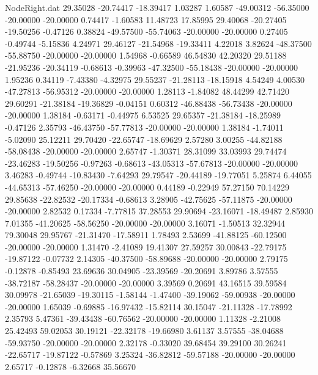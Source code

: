 \begin{filecontents}{NodeRight.dat}
  29.35028  -20.74417  -18.39417     1.03287    1.60587  -49.00312  -56.35000  -20.00000  -20.00000    0.74417   -1.60583   11.48723   17.85995
  29.40068  -20.27405  -19.50256    -0.47126    0.38824  -49.57500  -55.74063  -20.00000  -20.00000    0.27405   -0.49744   -5.15836    4.24971
  29.46127  -21.54968  -19.33411     4.22018    3.82624  -48.37500  -55.88750  -20.00000  -20.00000    1.54968   -0.66589   46.54830   42.20320
  29.51188  -21.95236  -20.34119    -0.68613   -0.39963  -47.32500  -55.18438  -20.00000  -20.00000    1.95236    0.34119   -7.43380   -4.32975
  29.55237  -21.28113  -18.15918     4.54249    4.00530  -47.27813  -56.95312  -20.00000  -20.00000    1.28113   -1.84082   48.44299   42.71420
  29.60291  -21.38184  -19.36829    -0.04151    0.60312  -46.88438  -56.73438  -20.00000  -20.00000    1.38184   -0.63171   -0.44975    6.53525
  29.65357  -21.38184  -18.25989    -0.47126    2.35793  -46.43750  -57.77813  -20.00000  -20.00000    1.38184   -1.74011   -5.02090   25.12211
  29.70420  -22.65747  -18.69629     2.57280    3.00255  -44.82188  -58.08438  -20.00000  -20.00000    2.65747   -1.30371   28.31099   33.03993
  29.74474  -23.46283  -19.50256    -0.97263   -0.68613  -43.05313  -57.67813  -20.00000  -20.00000    3.46283   -0.49744  -10.83430   -7.64293
  29.79547  -20.44189  -19.77051     5.25874    6.44055  -44.65313  -57.46250  -20.00000  -20.00000    0.44189   -0.22949   57.27150   70.14229
  29.85638  -22.82532  -20.17334    -0.68613    3.28905  -42.75625  -57.11875  -20.00000  -20.00000    2.82532    0.17334   -7.77815   37.28553
  29.90694  -23.16071  -18.49487     2.85930    7.01355  -41.20625  -58.56250  -20.00000  -20.00000    3.16071   -1.50513   32.32944   79.30048
  29.95767  -21.31470  -17.58911     1.78493    2.53699  -41.88125  -60.12500  -20.00000  -20.00000    1.31470   -2.41089   19.41307   27.59257
  30.00843  -22.79175  -19.87122    -0.07732    2.14305  -40.37500  -58.89688  -20.00000  -20.00000    2.79175   -0.12878   -0.85493   23.69636
  30.04905  -23.39569  -20.20691     3.89786    3.57555  -38.72187  -58.28437  -20.00000  -20.00000    3.39569    0.20691   43.16515   39.59584
  30.09978  -21.65039  -19.30115    -1.58144   -1.47400  -39.19062  -59.00938  -20.00000  -20.00000    1.65039   -0.69885  -16.97432  -15.82114
  30.15047  -21.11328  -17.78992     2.35793    5.47361  -39.43438  -60.76562  -20.00000  -20.00000    1.11328   -2.21008   25.42493   59.02053
  30.19121  -22.32178  -19.66980     3.61137    3.57555  -38.04688  -59.93750  -20.00000  -20.00000    2.32178   -0.33020   39.68454   39.29100
  30.26241  -22.65717  -19.87122    -0.57869    3.25324  -36.82812  -59.57188  -20.00000  -20.00000    2.65717   -0.12878   -6.32668   35.56670

\end{filecontents}
